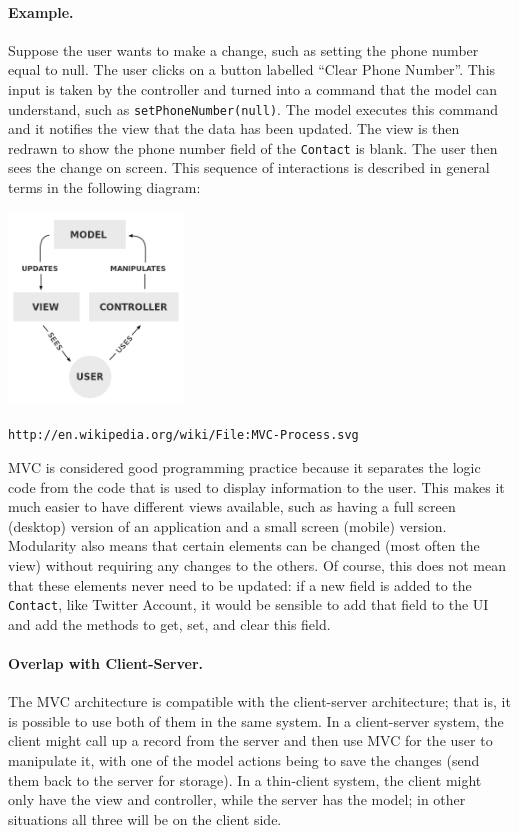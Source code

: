 \paragraph{Example.} Suppose the user wants to make a change, such as setting the phone number equal to null. The user clicks on a button labelled ``Clear Phone Number''. This input is taken by the controller and turned into a command that the model can understand, such as \texttt{setPhoneNumber(null)}. The model executes this command and it notifies the view that the data has been updated. The view is then redrawn to show the phone number field of the \texttt{Contact} is blank. The user then sees the change on screen.
This sequence of interactions is described in general terms in the following diagram:

\begin{center}
	\includegraphics[width=0.35\textwidth]{images/mvc.png}
	
	\texttt{\small http://en.wikipedia.org/wiki/File:MVC-Process.svg}
\end{center}

MVC is considered good programming practice because it separates the logic code from the code that is used to display information to the user. This makes it much easier to have different views available, such as having a full screen (desktop) version of an application and a small screen (mobile) version. Modularity also means that certain elements can be changed (most often the view) without requiring any changes to the others. Of course, this does not mean that these elements never need to be updated: if a new field is added to the \texttt{Contact}, like Twitter Account, it would be sensible to add that field to the UI and add the methods to get, set, and clear this field.

\paragraph{Overlap with Client-Server.} The MVC architecture is compatible with the client-server architecture; that is, it is possible to use both of them in the same system. In a client-server system, the client might call up a record from the server and then use MVC for the user to manipulate it, with one of the model actions being to save the changes (send them back to the server for storage). In a thin-client system, the client might only have the view and controller, while the server has the model; in other situations all three will be on the client side.

